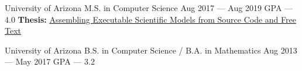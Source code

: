 
\vspace{-0.1cm}
\begin{cventries}
  \cventry
    {University of Arizona} %
    {M.S. in Computer Science} %
    {Aug 2017 --- Aug 2019} %
    {GPA --- 4.0} %
    {\textbf{Thesis:} \href{https://repository.arizona.edu/handle/10150/634301}{\underline{Assembling Executable Scientific Models from Source Code and Free Text}}}


  \cventry
    {University of Arizona} %
    {B.S. in Computer Science / B.A. in Mathematics} %
    {Aug 2013 --- May 2017} %
    {GPA --- 3.2} %
    {}
  \vspace{-0.5cm}
\end{cventries}
